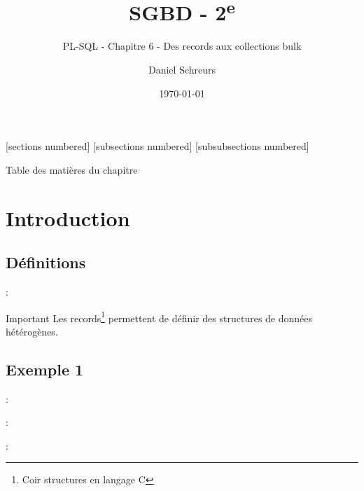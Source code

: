 \documentclass[10pt]{beamer}
\title{SGBD - 2\textsuperscript{e}}
\subtitle{PL-SQL - Chapitre 6 - Des records aux collections bulk}
\date{\today}
\author{Daniel Schreurs}
\institute{Haute École de la Province de Liège}
\begin{document}
\maketitle

[sections numbered]
[subsections numbered]
[subsubsections numbered]
\begin{frame}[allowframebreaks]{Table des matières du chapitre}
    \tableofcontents[subsectionstyle=show/show/hide,subsubsectionstyle=show/show/hide,]
\end{frame}

\section{Introduction}
\tocss
\subsection{Définitions}
\begin{frame}{\secname : \subsecname}
    \begin{alertblock}{Important}
        Les records\footnote{Coir structures en langage C} permettent de définir des structures de données hétérogènes.
    \end{alertblock}
\end{frame}
\subsection{Exemple 1}

\begin{frame}{\secname : \subsecname}
    
\end{frame}

\begin{frame}{\secname : \subsecname}
    
\end{frame}



\begin{frame}{\secname : \subsecname}
    
\end{frame}
\end{document}
